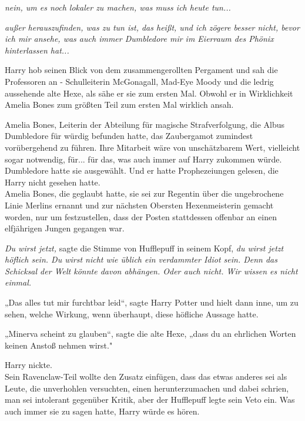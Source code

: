 {\emph{nein, um es noch lokaler zu machen, was muss ich heute tun...}

\emph{außer herauszufinden, was zu tun ist, das heißt, und ich zögere besser nicht, bevor ich mir ansehe, was auch immer Dumbledore mir im Eierraum des Phönix hinterlassen hat...}

Harry hob seinen Blick von dem zusammengerollten Pergament und sah die Professoren an - Schulleiterin McGonagall, Mad-Eye Moody und die ledrig aussehende alte Hexe, als sähe er sie zum ersten Mal. Obwohl er in Wirklichkeit Amelia Bones zum größten Teil zum ersten Mal wirklich ansah.

Amelia Bones, Leiterin der Abteilung für magische Strafverfolgung, die Albus Dumbledore für würdig befunden hatte, das Zaubergamot zumindest vorübergehend zu führen. Ihre Mitarbeit wäre von unschätzbarem Wert, vielleicht sogar notwendig, für... für das, was auch immer auf Harry zukommen würde. Dumbledore hatte sie ausgewählt. Und er hatte Prophezeiungen gelesen, die Harry nicht gesehen hatte.\\ Amelia Bones, die geglaubt hatte, sie sei zur Regentin über die ungebrochene Linie Merlins ernannt und zur nächsten Obersten Hexenmeisterin gemacht worden, nur um festzustellen, dass der Posten stattdessen offenbar an einen elfjährigen Jungen gegangen war.

\emph{Du wirst jetzt,} sagte die Stimme von Hufflepuff in seinem Kopf, \emph{du wirst jetzt höflich sein. Du wirst nicht wie üblich ein verdammter Idiot sein. Denn das Schicksal der Welt könnte davon abhängen. Oder auch nicht. Wir wissen es nicht einmal.}

„Das alles tut mir furchtbar leid“, sagte Harry Potter und hielt dann inne, um zu sehen, welche Wirkung, wenn überhaupt, diese höfliche Aussage hatte.

„Minerva scheint zu glauben“, sagte die alte Hexe, „dass du an ehrlichen Worten keinen Anstoß nehmen wirst."

Harry nickte.\\ Sein Ravenclaw-Teil wollte den Zusatz einfügen, dass das etwas anderes sei als Leute, die unverhohlen versuchten, einen herunterzumachen und dabei schrien, man sei intolerant gegenüber Kritik, aber der Hufflepuff legte sein Veto ein. Was auch immer sie zu sagen hatte, Harry würde es hören.

}
